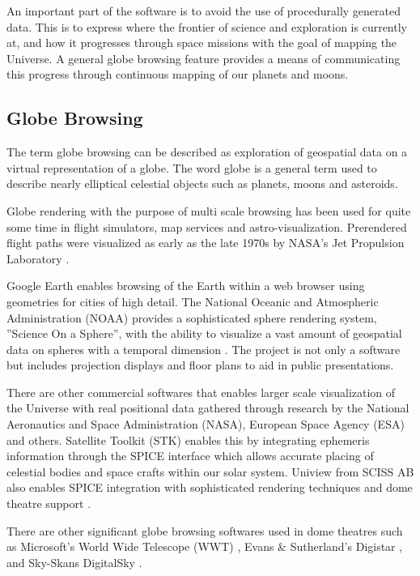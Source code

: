 An important part of the software is to avoid the use of procedurally generated data. This is to express where the frontier of science and exploration is currently at, and how it progresses through space missions with the goal of mapping the Universe. A general globe browsing feature provides a means of communicating this progress through continuous mapping of our planets and moons.

\subsection{Globe Browsing}

The term globe browsing can be described as exploration of geospatial data on a virtual representation of a globe. The word globe is a general term used to describe nearly elliptical celestial objects such as planets, moons and asteroids.

Globe rendering with the purpose of multi scale browsing has been used for quite some time in flight simulators, map services and astro-visualization. Prerendered flight paths were visualized as early as the late 1970s by NASA's Jet Propulsion Laboratory \cite{cozzi11}. 

Google Earth \cite{googlemaps} enables browsing of the Earth within a web browser using geometries for cities of high detail. The National Oceanic and Atmospheric Administration (NOAA) provides a sophisticated sphere rendering system, ''Science On a Sphere'', with the ability to visualize a vast amount of geospatial data on spheres with a temporal dimension \cite{sos}. The project is not only a software but includes projection displays and floor plans to aid in public presentations.

There are other commercial softwares that enables larger scale visualization of the Universe with real positional data gathered through research by the National Aeronautics and Space Administration (NASA), European Space Agency (ESA) and others. Satellite Toolkit (STK) enables this by integrating ephemeris information through the SPICE interface \cite{spice} which allows accurate placing of celestial bodies and space crafts within our solar system. Uniview from SCISS AB also enables SPICE integration with sophisticated rendering techniques and dome theatre support \cite{uniview}.

There are other significant globe browsing softwares used in dome theatres such as Microsoft's World Wide Telescope (WWT) \cite{wwt}, Evans \& Sutherland's Digistar \cite{digistar}, and Sky-Skans DigitalSky \cite{digitalsky}.

